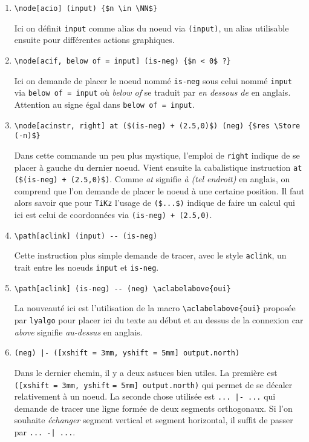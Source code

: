 \documentclass[12pt,a4paper]{article}
\theoremstyle{definition}
\newcommand\myquote[1]{{\itshape \og #1 \fg}}
\begin{document}
\begin{enumerate}
	\item \verb+\node[acio] (input) {$n \in \NN$}+
	      
	      \smallskip
	      Ici on définit \verb+input+ comme alias du noeud via \verb+(input)+, un alias utilisable ensuite pour différentes actions graphiques. 

	\medskip
	\item \verb+\node[acif, below of = input] (is-neg) {$n < 0$ ?}+

	      \smallskip
	      Ici on demande de placer le noeud nommé \verb+is-neg+ sous celui nommé \verb+input+ via \verb+below of = input+ où \myquote{below of} se traduit par \myquote{en dessous de} en anglais. Attention au signe égal dans \verb+below of = input+.
	
	\medskip
	\item \verb|\node[acinstr, right] at ($(is-neg) + (2.5,0)$) (neg) {$res \Store (-n)$}|
	      
	      \smallskip
	      Dans cette commande un peu plus mystique, l'emploi de \verb+right+ indique de se placer à gauche du dernier noeud.
	      Vient ensuite la cabalistique instruction \verb|at ($(is-neg) + (2.5,0)$)|.
	      Comme \myquote{at} signifie \myquote{à (tel endroit)} en anglais, on comprend que l'on demande de placer le noeud à une certaine position.
	       Il faut alors savoir que pour \verb+TiKz+ l'usage de \verb|($...$)| indique de faire un calcul qui ici est celui de coordonnées via \verb|(is-neg) + (2.5,0)|. 
	
	\medskip
	\item \verb+\path[aclink] (input) -- (is-neg)+
	      
	      \smallskip
	      Cette instruction plus simple demande de tracer, avec le style \verb+aclink+, un trait entre les noeuds \verb+input+ et \verb+is-neg+.
	
	\medskip
	\item \verb+\path[aclink] (is-neg) -- (neg) \aclabelabove{oui}+
	      
	      \smallskip
	      La nouveauté ici est l'utilisation de la macro \verb+\aclabelabove{oui}+ proposée par \verb+lyalgo+ pour placer ici du texte au début et au dessus de la connexion car \myquote{above} signifie \myquote{au-dessus} en anglais. 

	\medskip
	\item \verb+(neg) |- ([xshift = 3mm, yshift = 5mm] output.north)+
	      
	      \smallskip
	      Dans le dernier chemin, il y a deux astuces bien utiles. La première est \verb+([xshift = 3mm, yshift+
	      \verb+= 5mm] output.north)+ qui permet de se décaler relativement à un noeud.
	      La seconde chose utilisée est \verb+... |- ...+ qui demande de tracer une ligne formée de deux segments orthogonaux. Si l'on souhaite \myquote{échanger} segment vertical et segment horizontal, il suffit de passer par \verb+... -| ...+.
\end{enumerate}
\end{document}
